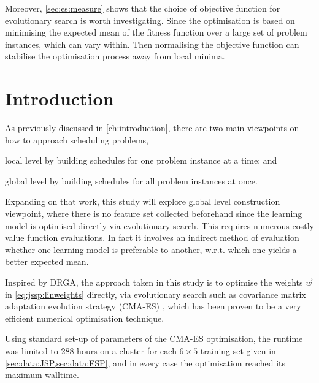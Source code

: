 Moreover, \cref{sec:es:measure} shows that the choice of objective function  for evolutionary search is worth investigating. Since the optimisation is based on minimising the expected mean of the fitness function over a large set of problem instances, which can vary within. Then normalising the objective function can stabilise the optimisation process away from local minima. 

\section{Introduction}
As previously discussed in \cref{ch:introduction}, there are two main viewpoints on how to approach scheduling problems,
\begin{inparaenum} 
	\item local level by building schedules for one problem instance at a time;
	and \item global level by building schedules for all problem instances at once.
\end{inparaenum}
 Expanding on 
that  work, this study will explore global level construction viewpoint, where 
there is no feature set collected beforehand since the learning model is 
optimised directly via evolutionary search. This requires numerous costly value 
function evaluations. In fact it involves an indirect method of evaluation 
whether one learning model is preferable to another, w.r.t. which one yields a 
better expected mean. 



Inspired by DRGA, the approach taken in this study is to optimise the weights $\vec{w}$ in \cref{eq:jssp:linweights} directly, via evolutionary search such as covariance matrix adaptation evolution strategy (CMA-ES) \cite{Hansen01}, which has been proven to be a very efficient numerical optimisation technique. 

Using standard set-up of parameters of the CMA-ES optimisation, the runtime was limited to 288 hours on a cluster for each $6\times5$ training set given in \cref{sec:data:JSP,sec:data:FSP}, and in every case the optimisation reached its maximum walltime.

